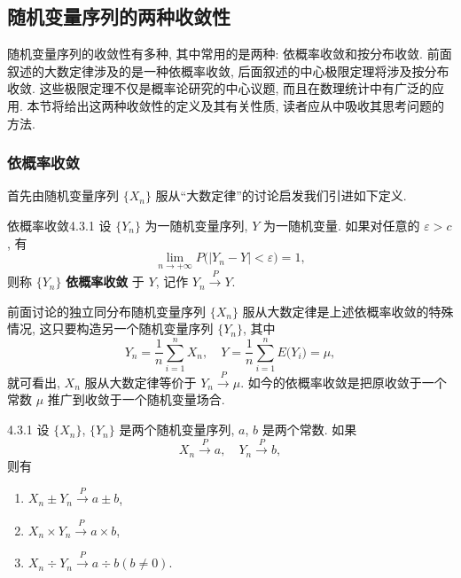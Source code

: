 \subsection{随机变量序列的两种收敛性}

随机变量序列的收敛性有多种, 其中常用的是两种: 依概率收敛和按分布收敛.
前面叙述的大数定律涉及的是一种依概率收敛, 后面叙述的中心极限定理将涉及按分布收敛.
这些极限定理不仅是概率论研究的中心议题, 而且在数理统计中有广泛的应用.
本节将给出这两种收敛性的定义及其有关性质, 读者应从中吸收其思考问题的方法.

\subsubsection{依概率收敛}

首先由随机变量序列 $ \{ X_n \} $ 服从``大数定律''的讨论启发我们引进如下定义.

\begin{definition}{依概率收敛}{4.3.1}
    设 $ \{ Y_n \} $ 为一随机变量序列, $ Y $ 为一随机变量.
    如果对任意的 $ \varepsilon > c $, 有
    \begin{equation}\label{eq:4.3.1}
        \lim_{n \to +\infty} P \bigl( \bigr\lvert Y_n - Y \bigr\rvert < \varepsilon \bigr) = 1,
    \end{equation}
    则称 $ \{ Y_n \} $ \textbf{依概率收敛} 于 $ Y $, 记作 $ Y_n \stackrel{P}{\to} Y $.
\end{definition}

前面讨论的独立同分布随机变量序列 $ \{ X_n \} $ 服从大数定律是上述依概率收敛的特殊情况, 这只要构造另一个随机变量序列 $ \{ Y_n \} $, 其中
\begin{equation*}
    Y_n = \frac{1}{n} \sum_{i=1}^n X_n, \quad Y = \frac{1}{n} \sum_{i=1}^n E \bigl( Y_i \bigr) = \mu,
\end{equation*}
就可看出, $ X_n $ 服从大数定律等价于 $ Y_n \stackrel{P}{\to} \mu $.
如今的依概率收敛是把原收敛于一个常数 $ \mu $ 推广到收敛于一个随机变量场合.

\begin{theorem}{}{4.3.1}
    设 $ \{ X_n \} $, $ \{ Y_n \} $ 是两个随机变量序列, $ a $, $ b $ 是两个常数.
    如果
    \begin{equation*}
        X_n \stackrel{P}{\to} a, \quad Y_n \stackrel{P}{\to} b,
    \end{equation*}
    则有
    \begin{enumerate}
        \item $ X_n \pm Y_n \stackrel{P}{\to} a \pm b $,
        \item $ X_n \times Y_n \stackrel{P}{\to} a \times b $,
        \item $ X_n \div Y_n \stackrel{P}{\to} a \div b (b \neq 0) $.
    \end{enumerate}
\end{theorem}


